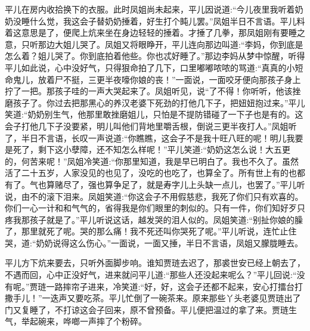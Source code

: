 \begin{parag}
    平儿在房内收拾换下的衣服。此时凤姐尚未起来，平儿因说道:“今儿夜里我听着奶奶没睡什么觉，我这会子替奶奶捶着，好生打个盹儿罢。”凤姐半日不言语。平儿料着这意思是了，便爬上炕来坐在身边轻轻的捶着。才捶了几拳，那凤姐刚有要睡之意，只听那边大姐儿哭了。凤姐又将眼睁开，平儿连向那边叫道:“李妈，你到底是怎么着？姐儿哭了。你到底拍着他些。你也忒好睡了。”那边李妈从梦中惊醒，听得平儿如此说，心中没好气，只得狠命拍了几下，口里嘟嘟哝哝的骂道:“真真的小短命鬼儿，放着尸不挺，三更半夜嚎你娘的丧！”一面说，一面咬牙便向那孩子身上拧了一把。那孩子哇的一声大哭起来了。凤姐听见，说“了不得！你听听，他该挫磨孩子了。你过去把那黑心的养汉老婆下死劲的打他几下子，把妞妞抱过来。”平儿笑道:“奶奶别生气，他那里敢挫磨姐儿，只怕是不提防错碰了一下子也是有的。这会子打他几下子没要紧，明儿叫他们背地里嚼舌根，倒说三更半夜打人。”凤姐听了，半日不言语，长叹一声说道:“你瞧瞧，这会子不是我十旺八旺的呢！明儿我要是死了，剩下这小孽障，还不知怎么样呢！”平儿笑道:“奶奶这怎么说！大五更的，何苦来呢！”凤姐冷笑道:“你那里知道，我是早已明白了。我也不久了。虽然活了二十五岁，人家没见的也见了，没吃的也吃了，也算全了。所有世上有的也都有了。气也算赌尽了，强也算争足了，就是寿字儿上头缺一点儿，也罢了。”平儿听说，由不的滚下泪来。凤姐笑道:“你这会子不用假慈悲，我死了你们只有欢喜的。你们一心一计和和气气的，省得我是你们眼里的刺似的。只有一件，你们知好歹只疼我那孩子就是了。”平儿听说这话，越发哭的泪人似的。凤姐笑道:“别扯你娘的臊了，那里就死了呢。哭的那么痛！我不死还叫你哭死了呢。”平儿听说，连忙止住哭，道:“奶奶说得这么伤心。”一面说，一面又捶，半日不言语，凤姐又朦胧睡去。
\end{parag}


\begin{parag}
    平儿方下炕来要去，只听外面脚步响。谁知贾琏去迟了，那裘世安已经上朝去了，不遇而回，心中正没好气，进来就问平儿道:“那些人还没起来呢么？”平儿回说:“没有呢。”贾琏一路摔帘子进来，冷笑道:“好，好，这会子还都不起来，安心打擂台打撒手儿！”一迭声又要吃茶。平儿忙倒了一碗茶来。原来那些丫头老婆见贾琏出了门又复睡了，不打谅这会子回来，原不曾预备。平儿便把温过的拿了来。贾琏生气，举起碗来，哗啷一声摔了个粉碎。
\end{parag}


